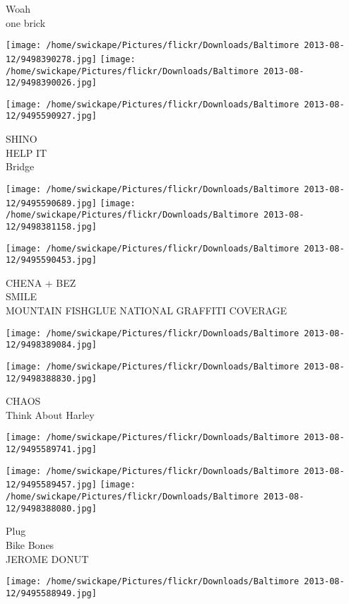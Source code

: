 \documentclass[10pt,letterpaper]{article}
\begin{document}
Woah\\
one brick
\pagebreak

\texttt{[image: /home/swickape/Pictures/flickr/Downloads/Baltimore 2013-08-12/9498390278.jpg]}
\texttt{[image: /home/swickape/Pictures/flickr/Downloads/Baltimore 2013-08-12/9498390026.jpg]}

\vspace{0.25in}
\texttt{[image: /home/swickape/Pictures/flickr/Downloads/Baltimore 2013-08-12/9495590927.jpg]}

SHINO\\
HELP IT\\
Bridge
\pagebreak

\texttt{[image: /home/swickape/Pictures/flickr/Downloads/Baltimore 2013-08-12/9495590689.jpg]}
\texttt{[image: /home/swickape/Pictures/flickr/Downloads/Baltimore 2013-08-12/9498381158.jpg]}

\texttt{[image: /home/swickape/Pictures/flickr/Downloads/Baltimore 2013-08-12/9495590453.jpg]}

CHENA + BEZ\\
SMILE\\
MOUNTAIN FISHGLUE NATIONAL GRAFFITI COVERAGE
\pagebreak

\texttt{[image: /home/swickape/Pictures/flickr/Downloads/Baltimore 2013-08-12/9498389084.jpg]}

\vspace{0.25in}
\texttt{[image: /home/swickape/Pictures/flickr/Downloads/Baltimore 2013-08-12/9498388830.jpg]}

CHAOS\\
Think About Harley
\pagebreak

\texttt{[image: /home/swickape/Pictures/flickr/Downloads/Baltimore 2013-08-12/9495589741.jpg]}

\vspace{0.25in}
\texttt{[image: /home/swickape/Pictures/flickr/Downloads/Baltimore 2013-08-12/9495589457.jpg]}
\texttt{[image: /home/swickape/Pictures/flickr/Downloads/Baltimore 2013-08-12/9498388080.jpg]}

Plug\\
Bike Bones\\
JEROME DONUT
\pagebreak

\texttt{[image: /home/swickape/Pictures/flickr/Downloads/Baltimore 2013-08-12/9495588949.jpg]}
\end{document}
